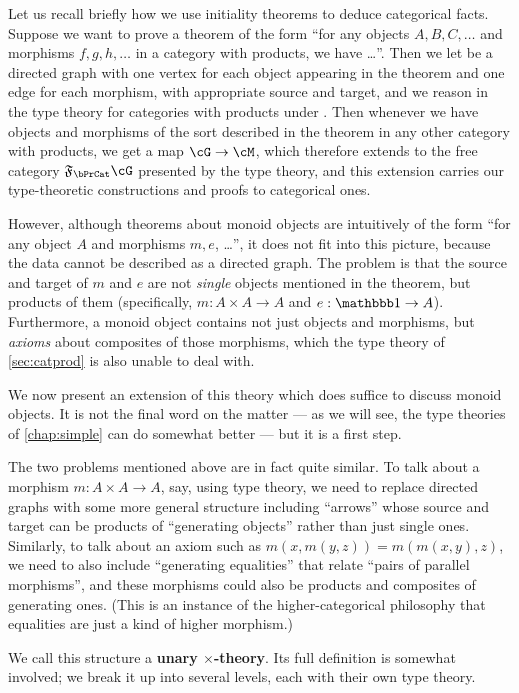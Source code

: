 Let us recall briefly how we use initiality theorems to deduce categorical facts.
Suppose we want to prove a theorem of the form ``for any objects $A,B,C,\dots$ and morphisms $f,g,h,\dots$ in a category with products, we have \dots''.
Then we let \cG be a directed graph with one vertex for each object appearing in the theorem and one edge for each morphism, with appropriate source and target, and we reason in the type theory for categories with products under \cG.
Then whenever we have objects and morphisms of the sort described in the theorem in any other category \cM with products, we get a map $\cG\to\cM$, which therefore extends to the free category $\F\bPrCat\cG$ presented by the type theory, and this extension carries our type-theoretic constructions and proofs to categorical ones.

However, although theorems about monoid objects are intuitively of the form ``for any object $A$ and morphisms $m,e$, \dots'', it does not fit into this picture, because the data cannot be described as a directed graph.
The problem is that the source and target of $m$ and $e$ are not \emph{single} objects mentioned in the theorem, but products of them (specifically, $m:A\times A\to A$ and $e:\unit\to A$).
Furthermore, a monoid object contains not just objects and morphisms, but \emph{axioms} about composites of those morphisms, which the type theory of \cref{sec:catprod} is also unable to deal with.

We now present an extension of this theory which does suffice to discuss monoid objects.
It is not the final word on the matter --- as we will see, the type theories of \cref{chap:simple} can do somewhat better --- but it is a first step.

The two problems mentioned above are in fact quite similar.
To talk about a morphism $m:A\times A\to A$, say, using type theory, we need to replace directed graphs with some more general structure including ``arrows'' whose source and target can be products of ``generating objects'' rather than just single ones.
Similarly, to talk about an axiom such as $m(x,m(y,z)) = m(m(x,y),z)$, we need to also include ``generating equalities'' that relate ``pairs of parallel morphisms'', and these morphisms could also be products and composites of generating ones.
(This is an instance of the higher-categorical philosophy that equalities are just a kind of higher morphism.)

We call this structure a \textbf{unary $\times$-theory}.
Its full definition is somewhat involved; we break it up into several levels, each with their own type theory.

